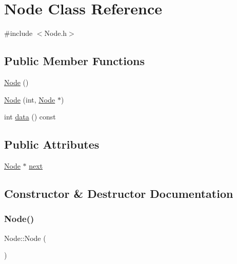 \hypertarget{classNode}{}\section{Node Class Reference}
\label{classNode}


{\ttfamily \#include $<$Node.\+h$>$}

\subsection*{Public Member Functions}
\begin{DoxyCompactItemize}
\item 
\mbox{\hyperlink{classNode_ad7a34779cad45d997bfd6d3d8043c75f}{Node}} ()
\item 
\mbox{\hyperlink{classNode_aff31c12e14a6f00952a46ff967db0c96}{Node}} (int, \mbox{\hyperlink{classNode}{Node}} $\ast$)
\item 
int \mbox{\hyperlink{classNode_a1f22dfa731ed0a407e0cf5fa70367c31}{data}} () const
\end{DoxyCompactItemize}
\subsection*{Public Attributes}
\begin{DoxyCompactItemize}
\item 
\mbox{\hyperlink{classNode}{Node}} $\ast$ \mbox{\hyperlink{classNode_a2559a716f69ccaa76d648d9f1b83065e}{next}}
\end{DoxyCompactItemize}


\subsection{Constructor \& Destructor Documentation}
\mbox{\label{classNode_ad7a34779cad45d997bfd6d3d8043c75f}} 
\subsubsection{\texorpdfstring{Node()}{Node()}\hspace{0.1cm}{\footnotesize\ttfamily [1/2]}}
{\footnotesize\ttfamily Node\+::\+Node (\begin{DoxyParamCaption}{ }\end{DoxyParamCaption})}

\mbox{\label{classNode_aff31c12e14a6f00952a46ff967db0c96}} 
